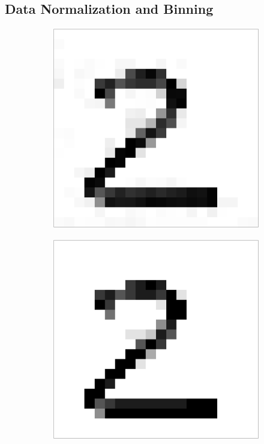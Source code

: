 \subsection{Data Normalization and Binning}

\begin{figure}[h]
\centering
    \begin{subfigure}{0.2\textwidth}
        \includegraphics[width = \textwidth]{graphics/bins_inf}
    \end{subfigure}
    \begin{subfigure}{0.2\textwidth}
        \includegraphics[width = \textwidth]{graphics/bins_10}

\end{subfigure}
\end{figure}
